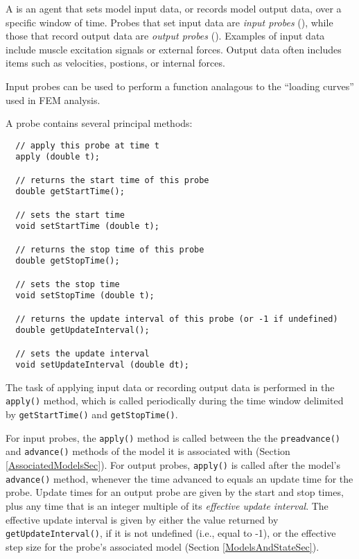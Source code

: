 \documentclass{article}
\begin{document}

A  is an agent that sets model input data, or records
model output data, over a specific window of time. Probes that set
input data are {\it input probes} (), while those that
record output data are {\it output probes} (). Examples
of input data include muscle excitation signals or external
forces. Output data often includes items such as velocities, postions,
or internal forces.

Input probes can be used to perform a function analagous to
the ``loading curves'' used in FEM analysis.

A probe contains several principal methods:
\begin{lstlisting}
  // apply this probe at time t
  apply (double t);

  // returns the start time of this probe
  double getStartTime();

  // sets the start time
  void setStartTime (double t);

  // returns the stop time of this probe
  double getStopTime();

  // sets the stop time
  void setStopTime (double t);

  // returns the update interval of this probe (or -1 if undefined) 
  double getUpdateInterval();

  // sets the update interval
  void setUpdateInterval (double dt);
\end{lstlisting}

The task of applying input data or recording output data is performed
in the {\tt apply()} method, which is called periodically during the time
window delimited by {\tt getStartTime()} and {\tt getStopTime()}. 

For input probes, the {\tt apply()} method is called between the the
{\tt preadvance()} and {\tt advance()} methods of the model it is
associated with (Section \ref{AssociatedModelsSec}).  For output
probes, {\tt apply()} is called after the model's {\tt advance()} method,
whenever the time advanced to equals an update time for the
probe. Update times for an output probe are given by the start and
stop times, plus any time that is an integer multiple of its {\it
effective update interval}. The effective update interval is given by
either the value returned by {\tt getUpdateInterval()}, if it is not
undefined (i.e., equal to -1), or the effective step size for the
probe's associated model (Section \ref{ModelsAndStateSec}).
\end{document}
